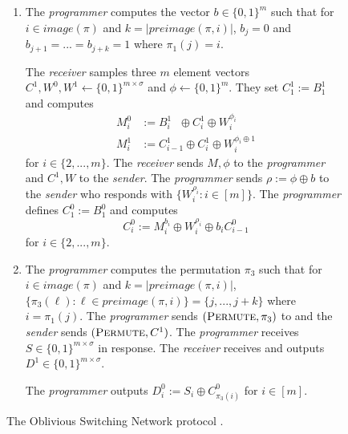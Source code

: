 \begin{figure}[ht!]
{\begin{minipage}{0.95\linewidth}
\begin{enumerate}
\begin{enumerate}
					The \emph{programmer}  sends $(\textsc{Permute}, \pi_1)$ to  and the \emph{sender} sends $(\textsc{Permute}, A)$. The \emph{programmer} receives $B^{0}\in \{0,1\}^{m\times \sigma}$ in response and the \emph{receiver} receives $B^{1}\in \{0,1\}^{m\times \sigma}$. 
					
					\item The \emph{programmer}  computes the vector $b\in\{0,1\}^{m}$ such that for $i\in image(\pi)$ and $k=|preimage(\pi, i)|$, $b_j = 0$ and $b_{j+1}=...=b_{j+k}=1$ where $\pi_1(j)=i$.
					
					The \emph{receiver} samples three $m$ element vectors $C^{1}, W^0,W^1\gets \{0,1\}^{m\times \sigma}$ and $\phi\gets\{0,1\}^m$. They set $C^{1}_1:=B^{1}_1$ and computes 
					\begin{align*}
						M^0_i&:= B^1_{i}\ \ \, \oplus C^{1}_i \oplus W^{\phi_i}_i\\
						M^1_i&:= C^1_{i-1} \oplus C^{1}_i \oplus W^{\phi_i\oplus 1}_i
					\end{align*}
					for $i\in \{2,...,m\}$. The \emph{receiver} sends $M,\phi$ to the \emph{programmer} and $C^{1},W$ to the \emph{sender}. The \emph{programmer} sends $\rho:=\phi\oplus b$ to the \emph{sender} who responds with $\{ W^{\rho_i}_i : i\in [m] \}$. The \emph{programmer} defines $C^{0}_1:=B^{0}_1$ and computes 
					$$
						C^{0}_i:= M^{b_i}_i \oplus W^{\rho_i}_i\oplus b_iC^{0}_{i-1}
					$$
					for $i\in \{2,...,m\}$.
					\item The \emph{programmer} computes the permutation $\pi_3$ such that for  $i\in image(\pi)$ and $k=|preimage(\pi, i)|$, $\{\pi_3(\ell) : \ell\in preimage(\pi, i)\}=\{j, ..., j +k\}$ where $i=\pi_1(j)$.	The \emph{programmer} sends $(\textsc{Permute}, \pi_3)$ to  and the \emph{sender} sends $(\textsc{Permute}, C^{1})$.  The \emph{programmer} receives $S\in \{0,1\}^{m\times \sigma }$ in response. The \emph{receiver} receives and outputs $D^{1}\in \{0,1\}^{m\times \sigma }$.
					
					The \emph{programmer} outputs $D^{0}_i:=S_i\oplus C^{0}_{\pi_3(i)}$ for $i\in [m]$.
				\end{enumerate}
			\end{enumerate}
	\end{minipage}}
	\caption{The Oblivious Switching Network protocol . }
	\label{fig:switching-net}	
\end{figure}





